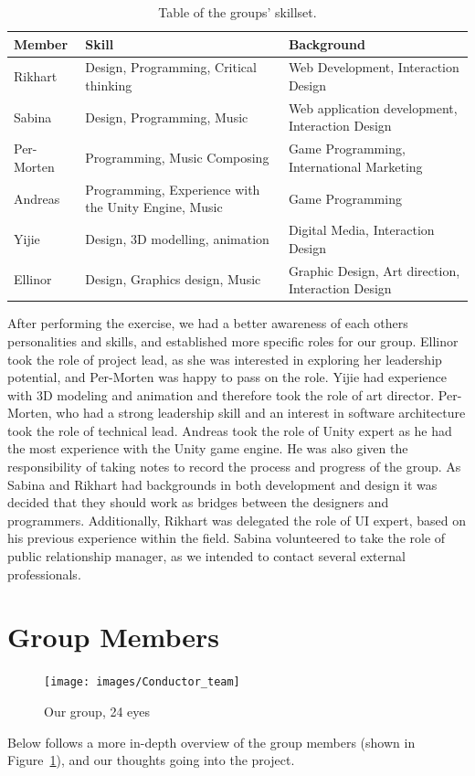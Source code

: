 \begin{table}[H]
    \centering
    \begin{tabularx}{\linewidth}{ | l | X | X |}
        \hline
        \textbf{Member} & \textbf{Skill} & \textbf{Background}  \\
        \hline
        Rikhart & Design, Programming, Critical thinking & Web Development, Interaction Design \\
        \hline
        Sabina & Design, Programming, Music & Web application development, Interaction Design \\
        \hline
        Per-Morten & Programming, Music Composing & Game Programming, International Marketing \\ 
        \hline
        Andreas & Programming, Experience with the Unity Engine, Music & Game Programming  \\
        \hline
        Yijie & Design, 3D modelling, animation & Digital Media, Interaction Design \\
        \hline
        Ellinor & Design, Graphics design, Music & Graphic Design, Art direction, Interaction Design  \\
        \hline
    \end{tabularx}
    \caption{Table of the groups' skillset.}
    \label{table:skills}
\end{table}

After performing the exercise, we had a better awareness of each others personalities and skills, and established more specific roles for our group. Ellinor took the role of project lead, as she was interested in exploring her leadership potential, and Per-Morten was happy to pass on the role. Yijie had experience with 3D modeling and animation and therefore took the role of art director. Per-Morten, who had a strong leadership skill and an interest in software architecture took the role of technical lead. Andreas took the role of Unity expert as he had the most experience with the Unity game engine. He was also given the responsibility of taking notes to record the process and progress of the group. As Sabina and Rikhart had backgrounds in both development and design it was decided that they should work as bridges between the designers and programmers. Additionally, Rikhart was delegated the role of UI expert, based on his previous experience within the field. Sabina volunteered to take the role of public relationship manager, as we intended to contact several external professionals.
\section{Group Members}
\begin{figure}[tpbh]
    \centering
    \texttt{[image: images/Conductor\_team]}
    \caption[Group Photo]{Our group, 24 eyes}
    \label{fig:conductor_team}
\end{figure}
Below follows a more in-depth overview of the group members (shown in Figure~\ref{fig:conductor_team}), and our thoughts going into the project.
